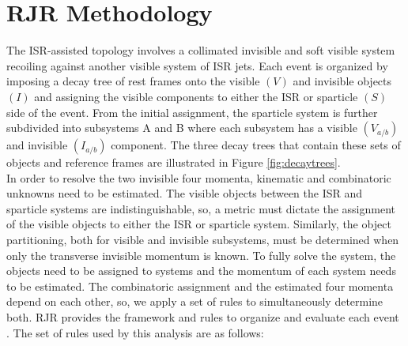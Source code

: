\section{ RJR Methodology}
 The ISR-assisted topology involves a collimated invisible and soft visible system recoiling against another visible system of ISR jets. Each event is organized by imposing a decay tree of rest frames onto the visible $(V)$ and invisible objects $(I)$ and assigning the visible components to either the ISR or sparticle $(S)$ side of the event. From the initial assignment, the sparticle system is further subdivided into subsystems A and B where each subsystem has a visible $(V_{a/b})$ and invisible  $(I_{a/b})$ component. The three decay trees that contain these sets of objects and reference frames are illustrated in Figure \ref{fig:decaytrees}. \\
In order to resolve the two invisible four momenta, kinematic and combinatoric unknowns need to be estimated. The visible objects between the ISR and sparticle systems are indistinguishable, so, a metric must dictate the assignment of the visible objects to either the ISR or sparticle system. Similarly, the object partitioning, both for visible and invisible subsystems, must be determined when only the transverse invisible momentum is known. To fully solve the system, the objects need to be assigned to systems and the momentum of each system needs to be estimated. The combinatoric assignment and the estimated four momenta depend on each other, so, we  apply a set of rules to simultaneously determine both.  RJR provides the framework and rules to organize and evaluate each event \cite{PhysRevD.96.112007}. The set of rules used by this analysis are as follows:
